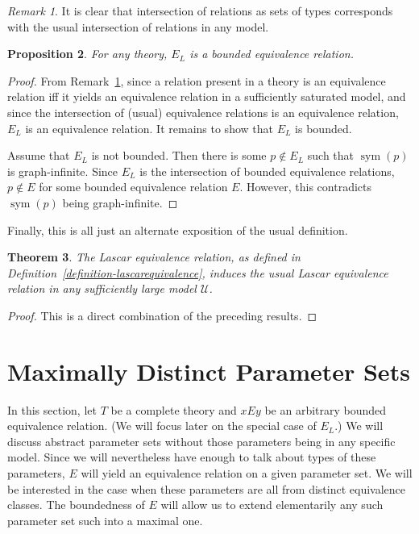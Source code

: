 \documentclass[letterpaper,twoside]{article}
\newtheorem{theorem}{Theorem}[section]
\newtheorem{proposition}[theorem]{Proposition}
\theoremstyle{definition}
\theoremstyle{remark}
\newtheorem{remark}[theorem]{Remark}
\DeclareMathOperator{\sym}{sym}
\begin{document}
\begin{remark}\label{remark-relationintersection}
  It is clear that intersection of relations as sets of types
  corresponds with the usual intersection of relations in any model.
\end{remark}

\begin{proposition}
  For any theory, \(E_L\) is a bounded equivalence relation.
\end{proposition}
\begin{proof}
  From Remark~\ref{remark-relationintersection}, since a relation
  present in a theory is an equivalence relation iff it yields an
  equivalence relation in a sufficiently saturated model, and since
  the intersection of (usual) equivalence relations is an equivalence
  relation, \(E_L\) is an equivalence relation.  It remains to show
  that \(E_L\) is bounded.

  Assume that \(E_L\) is not bounded.  Then there is some \(p \notin
  E_L\) such that \(\sym(p)\) is graph-infinite.  Since \(E_L\) is the
  intersection of bounded equivalence relations, \(p \notin E\) for
  some bounded equivalence relation \(E\).  However, this contradicts
  \(\sym(p)\) being graph-infinite.
\end{proof}

Finally, this is all just an alternate exposition of the usual
definition.

\begin{theorem}
  The Lascar equivalence relation, as defined in
  Definition~\ref{definition-lascarequivalence}, induces the usual
  Lascar equivalence relation in any sufficiently large model
  \(\mathcal{U}\).
\end{theorem}
\begin{proof}
  This is a direct combination of the preceding results.
\end{proof}

\section{Maximally Distinct Parameter Sets}

In this section, let \(T\) be a complete theory and \(xEy\) be an
arbitrary bounded equivalence relation.  (We will focus later on the
special case of \(E_L\).)  We will discuss abstract parameter sets
without those parameters being in any specific model.  Since we will
nevertheless have enough to talk about types of these parameters,
\(E\) will yield an equivalence relation on a given parameter set.  We
will be interested in the case when these parameters are all from
distinct equivalence classes.  The boundedness of \(E\) will allow us
to extend elementarily any such parameter set such into a maximal one.
\end{document}
